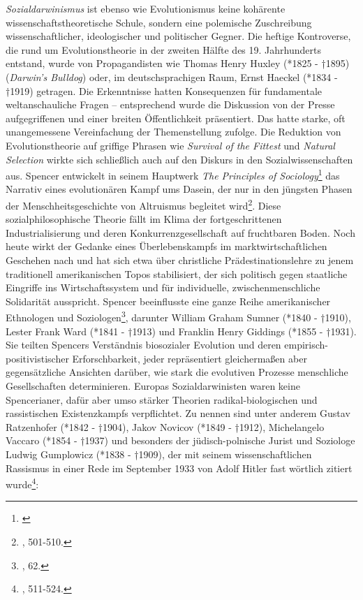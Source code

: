 \documentclass[openany,twoside,twocolumn]{book}
\let\rmarkdownfootnote\footnote%
\def\footnote{\protect\rmarkdownfootnote}
\begin{document}
\emph{Sozialdarwinismus} ist ebenso wie Evolutionismus keine kohärente
wissenschaftstheoretische Schule, sondern eine polemische Zuschreibung
wissenschaftlicher, ideologischer und politischer Gegner. Die heftige
Kontroverse, die rund um Evolutionstheorie in der zweiten Hälfte des 19.
Jahrhunderts entstand, wurde von Propagandisten wie Thomas Henry Huxley
(*1825 - †1895) (\emph{Darwin's Bulldog}) oder, im deutschsprachigen
Raum, Ernst Haeckel (*1834 - †1919) getragen. Die Erkenntnisse hatten
Konsequenzen für fundamentale weltanschauliche Fragen -- entsprechend
wurde die Diskussion von der Presse aufgegriffenen und einer breiten
Öffentlichkeit präsentiert. Das hatte starke, oft unangemessene
Vereinfachung der Themenstellung zufolge. Die Reduktion von
Evolutionstheorie auf griffige Phrasen wie \emph{Survival of the
Fittest} und \emph{Natural Selection} wirkte sich schließlich auch auf
den Diskurs in den Sozialwissenschaften aus. Spencer entwickelt in
seinem Hauptwerk \emph{The Principles of Sociology}\footnote{\textcite{SpencerHerbertSpencerPrinciples1898}}
das Narrativ eines evolutionären Kampf ums Dasein, der nur in den
jüngsten Phasen der Menschheitsgeschichte von Altruismus begleitet
wird\footnote{\textcite{petermann_geschichte_2004}, 501-510.}. Diese
sozialphilosophische Theorie fällt im Klima der fortgeschrittenen
Industrialisierung und deren Konkurrenzgesellschaft auf fruchtbaren
Boden. Noch heute wirkt der Gedanke eines Überlebenskampfs im
marktwirtschaftlichen Geschehen nach und hat sich etwa über christliche
Prädestinationslehre zu jenem traditionell amerikanischen Topos
stabilisiert, der sich politisch gegen staatliche Eingriffe ins
Wirtschaftssystem und für individuelle, zwischenmenschliche Solidarität
ausspricht. Spencer beeinflusste eine ganze Reihe amerikanischer
Ethnologen und Soziologen\footnote{\textcite{smith_cultural_1992}, 62.},
darunter William Graham Sumner (*1840 - †1910), Lester Frank Ward (*1841
- †1913) und Franklin Henry Giddings (*1855 - †1931). Sie teilten
Spencers Verständnis biosozialer Evolution und deren
empirisch-positivistischer Erforschbarkeit, jeder repräsentiert
gleichermaßen aber gegensätzliche Ansichten darüber, wie stark die
evolutiven Prozesse menschliche Gesellschaften determinieren. Europas
Sozialdarwinisten waren keine Spencerianer, dafür aber umso stärker
Theorien radikal-biologischen und rassistischen Existenzkampfs
verpflichtet. Zu nennen sind unter anderem Gustav Ratzenhofer (*1842 -
†1904), Jakov Novicov (*1849 - †1912), Michelangelo Vaccaro (*1854 -
†1937) und besonders der jüdisch-polnische Jurist und Soziologe Ludwig
Gumplowicz (*1838 - †1909), der mit seinem wissenschaftlichen Rassismus
in einer Rede im September 1933 von Adolf Hitler fast wörtlich zitiert
wurde\footnote{\textcite{petermann_geschichte_2004}, 511-524.}:
\end{document}
